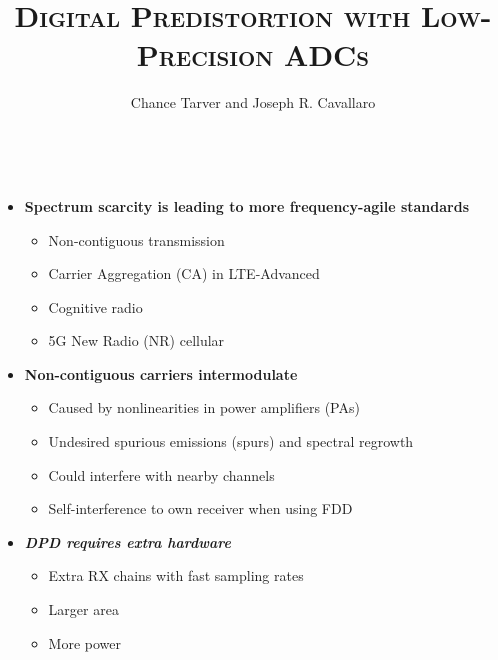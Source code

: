 \documentclass[25pt]{tikzposter} %
\title{\bf \textsc{Digital Predistortion with Low-Precision ADCs}}
\institute{Rice University} %
\author{Chance Tarver and Joseph R. Cavallaro}
\begin{document}
\maketitle %

\begin{columns} %
	\centering
	{    \Large
		\begin{itemize}
			\item {\bf Spectrum scarcity is leading to more frequency-agile standards}
			      \begin{itemize}
				      \item Non-contiguous transmission
				      \item Carrier Aggregation (CA) in LTE-Advanced
				      \item Cognitive radio
				      \item 5G New Radio (NR) cellular
			      \end{itemize}
			\item {\bf Non-contiguous carriers intermodulate}
			      \begin{itemize}
				      \item Caused by nonlinearities in power amplifiers (PAs)
				      \item Undesired spurious emissions (spurs) and spectral regrowth
				      \item Could interfere with nearby channels
				      \item Self-interference to own receiver when using FDD
			      \end{itemize}
			\item{\textbf{\textit{ DPD requires extra hardware}}}
				\begin{itemize}
					\item Extra RX chains with fast sampling rates 
					\item Larger area
					\item More power
				\end{itemize}			

\end{itemize}}
\end{columns}
\end{document}
